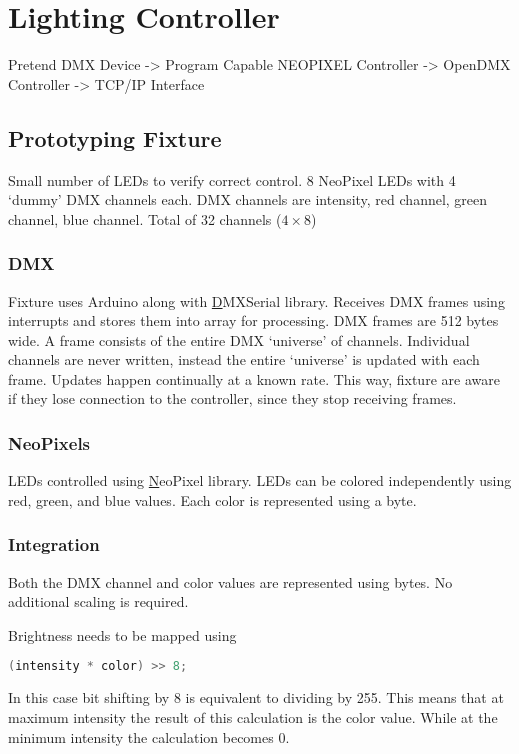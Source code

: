 \chapter{Lighting Controller}
Pretend DMX Device -> Program Capable NEOPIXEL Controller -> OpenDMX Controller -> TCP/IP Interface
\section{Prototyping Fixture}
Small number of LEDs to verify correct control.
8 NeoPixel LEDs with 4 `dummy' DMX channels each.
DMX channels are intensity, red channel, green channel, blue channel.
Total of 32 channels (\(4 \times 8\))

\subsection{DMX}
Fixture uses Arduino along with
\href{https://github.com/mathertel/DMXSerial}DMXSerial library.
Receives DMX frames using interrupts
and stores them into array for processing.
DMX frames are 512 bytes wide.
A frame consists of the entire DMX `universe' of channels.
Individual channels are never written,
instead the entire `universe' is updated with each frame.
Updates happen continually at a known rate.
This way, fixture are aware if they lose connection to the controller,
since they stop receiving frames.

\subsection{NeoPixels}
LEDs controlled using \href{https://github.com/adafruit/Adafruit_NeoPixel}NeoPixel library.
LEDs can be colored independently using red, green, and blue values.
Each color is represented using a byte.

\subsection{Integration}
Both the DMX channel and color values are represented using bytes.
No additional scaling is required.

Brightness needs to be mapped using
\begin{lstlisting}[language=C]
  (intensity * color) >> 8;
\end{lstlisting}

In this case bit shifting by 8 is equivalent to dividing by 255.
This means that at maximum intensity the result of this calculation is the color value.
While at the minimum intensity the calculation becomes 0.

